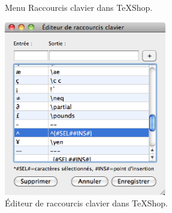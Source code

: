 \documentclass[11pt,french]{article}
\newcommand{\TS}{\textsf{\TeX Shop}}
\newcommand{\mnu}[1]{\textsf{#1}}
\newcommand{\To}{\,\(\to\)\,}
\begin{document}

\begin{figure}
\centering
{}
\caption{Menu Raccourcis clavier dans \TS.\label{fig:keybindingmenu}}
\end{figure}

\begin{figure}
\centering
\includegraphics[height=3.00in]{figs/editeurraccourcis}
\caption{Éditeur de raccourcis clavier dans \TS.\label{fig:keybindeditor}}
\end{figure}


\end{document}
